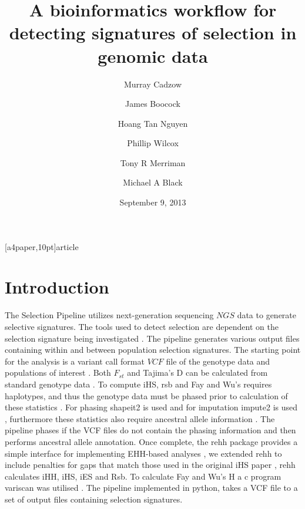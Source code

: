 [a4paper,10pt]{article}
\usepackage{hyperref}
\usepackage{setspace}
\usepackage{graphicx}
\usepackage{color}
\usepackage{xcolor}
\usepackage{relsize}
\usepackage{listings}
\usepackage[round]{natbib}
\usepackage{minted}
\usepackage{float}
\hypersetup{colorlinks = true, linkcolor = blue}
\lstset{language=Python}
\usepackage[margin=0.5in]{geometry}

\usepackage{listings}
\usepackage{makeidx}
\usepackage{titlesec}
\setcounter{tocdepth}{5}
\usepackage[T1]{fontenc}
\usepackage[utf8]{inputenc}
\usepackage{authblk}
\makeindex{}


\title{\textbf{A bioinformatics workflow for detecting signatures of selection in genomic data}}
\date{September 9, 2013}

\author[1,2]{Murray Cadzow}
\author[1,2]{James Boocock}
\author[1,2]{Hoang Tan Nguyen}
\author[2,3]{Phillip Wilcox}
\author[1]{Tony R Merriman}
\author[1]{Michael A Black}
\renewcommand\Authands{ and }


\maketitle{}
\doublespacing
\tableofcontents
\section{Introduction}
The Selection Pipeline utilizes next-generation sequencing \(NGS\) data to generate selective signatures. The tools used to detect selection are dependent on the selection signature being investigated \citep{Sabeti:2006ha}. The pipeline generates various output files containing within and between population selection signatures. The starting point for the analysis is a variant call format \(VCF\) file of the genotype data and populations of interest \citep{Danecek:2011gz}. Both $F_{st}$ and Tajima's D can be calculated from standard genotype data \citep{Weir:1984vn} \citep{Tajima:1989un}. To compute iHS, rsb and Fay and Wu's requires haplotypes, and thus the genotype data must be phased prior to calculation of these statistics \citep{Voight:2006go} \citep{Gautier:2012et} \citep{fayandwush}. For phasing shapeit2 is used and for imputation impute2 is used \citep{impute22009} \citep{Delaneau:2013hi}, furthermore these statistics also require ancestral allele information \citep{Flicek:2012vg}.  The pipeline phases if the VCF files do not contain the phasing information and then performs ancestral allele annotation. Once complete, the rehh package provides a simple interface for implementing EHH-based analyses \citep{Gautier:2012et}, we extended rehh to include penalties for gaps that match those used in the original iHS paper \citep{Voight:2006go}, rehh calculates iHH, iHS, iES and Rsb. To calculate Fay and Wu's H a c program variscan was utilised \citep{variscan2005}. The pipeline implemented in python, takes a VCF file to a set of output files containing selection signatures.
